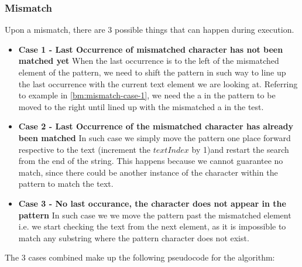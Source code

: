 \documentclass{l4proj}
\begin{document}
\subsubsection{Mismatch} Upon a mismatch, there are 3 possible things that can happen during execution.
\begin{itemize}
  \item \textbf{Case 1 - Last Occurrence of mismatched character has not been matched yet}
  When the last occurrence is to the left of the mismatched element of the pattern, we need to shift the pattern in such way to line up the last occurrence with the current text element we are looking at.  Referring to example in \ref{bm:mismatch-case-1}, we need the a in the pattern to be moved to the right until lined up with the mismatched a in the test.
  \item \textbf{Case 2 - Last Occurrence of the mismatched character has already been matched} In such case we simply move the pattern one place forward respective to the text (increment the $textIndex$ by 1)and restart the search from the end of the string. This happens because we cannot guarantee no match, since there could be another instance of the character within the pattern to match the text.
  \item \textbf{Case 3 - No last occurance, the character does not appear in the pattern} In such case we we move the pattern past the mismatched element i.e. we start checking the text from the next element, as it is impossible to match any substring where the pattern character does not exist.
\end{itemize}

The 3 cases combined make up the following pseudocode for the algorithm:

\end{document}
